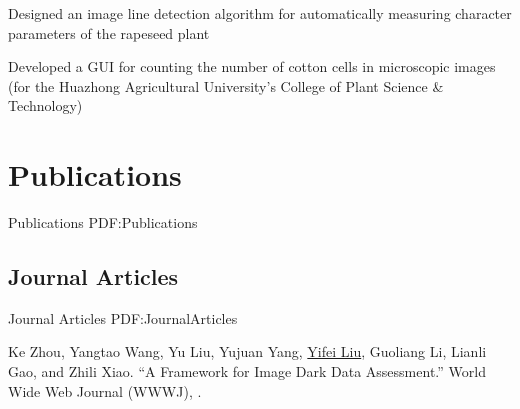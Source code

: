 \documentclass[letterpaper,10pt,oneside]{article}
\begin{document}
\begin{body}
\GapNoBreak
\BulletItem
Designed an image line detection algorithm for automatically measuring character parameters of the rapeseed plant

\GapNoBreak
\BulletItem
Developed a GUI for counting the number of cotton cells in microscopic images (for the Huazhong Agricultural University's College of Plant Science \& Technology)


\section
{Publications}
{Publications}
{PDF:Publications}

\iffalse
\subsection
{Journals}
{Journals}
{PDF:Journals}

\GapNoBreak
\NumberedItem{[11]}
\href{http://www.example.com/my-paper-doi-5}
{\underline{J.~Doe}, J.~Citizen, and A.~Yone,
``On lasers and climate change,''
\textit{Journal of Science},
vol.~89,
no.~2,
pp.~4123--4133,
\DatestampYM{2008}{02}.}

\Gap
\NumberedItem{{\CharSpace}[1]}
\href{http://www.example.com/my-paper-doi-4}
{\underline{J.~Doe} and J.~Citizen,
``Measuring the extent of climate change,''
\textit{Global Scientific Journal},
vol.~12,
no.~4,
pp.~330--352,
\DatestampYM{2006}{12}.}
\fi


\subsection
{Journal Articles}
{Journal Articles}
{PDF:JournalArticles}
\GapNoBreak

\NumberedItem{[1]}
Ke Zhou, Yangtao Wang, Yu Liu, Yujuan Yang, \underline{Yifei Liu}, Guoliang Li, Lianli Gao, and Zhili Xiao.
``A Framework for Image Dark Data Assessment.'' 
World Wide Web Journal (WWWJ),
.


\end{body}
\end{document}
